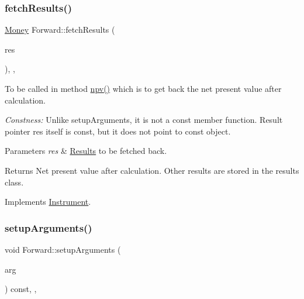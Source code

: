 \subsubsection{\texorpdfstring{fetch\+Results()}{fetchResults()}}
{\footnotesize\ttfamily \hyperlink{_name_def_8h_a5a9d48c16a694e9a2d9f1eca730dc8c5}{Money} Forward\+::fetch\+Results (\begin{DoxyParamCaption}\item[{\hyperlink{class_pricing_engine_1_1_results}{Pricing\+Engine\+::\+Results} $\ast$const}]{res }\end{DoxyParamCaption})\hspace{0.3cm}{\ttfamily [override]}, {\ttfamily [private]}, {\ttfamily [virtual]}}



To be called in method \hyperlink{class_instrument_aa750f2ae95a21d65a073da3171e8d084}{npv()} which is to get back the net present value after calculation. 

{\itshape Constness\+:} Unlike setup\+Arguments, it is not a const member function. Result pointer res itself is const, but it does not point to const object. 
\begin{DoxyParams}{Parameters}
{\em res} & \hyperlink{class_forward_1_1_results}{Results} to be fetched back. \\
\hline
\end{DoxyParams}
\begin{DoxyReturn}{Returns}
Net present value after calculation. Other results are stored in the results class. 
\end{DoxyReturn}


Implements \hyperlink{class_instrument_a381f093402f789ad7c0ffecd233167dc}{Instrument}.

\hypertarget{class_forward_a909ab0cefa0ab42bdaf3bf6e84ac0096}{}\label{class_forward_a909ab0cefa0ab42bdaf3bf6e84ac0096} 
\subsubsection{\texorpdfstring{setup\+Arguments()}{setupArguments()}}
{\footnotesize\ttfamily void Forward\+::setup\+Arguments (\begin{DoxyParamCaption}\item[{\hyperlink{class_pricing_engine_1_1_arguments}{Pricing\+Engine\+::\+Arguments} $\ast$const}]{arg }\end{DoxyParamCaption}) const\hspace{0.3cm}{\ttfamily [override]}, {\ttfamily [private]}, {\ttfamily [virtual]}}



